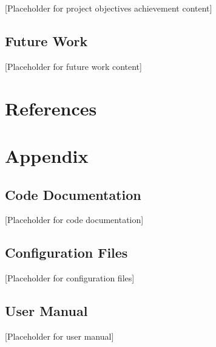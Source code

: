 \documentclass[12pt,a4paper]{article}
\begin{document}

[Placeholder for project objectives achievement content]

\subsection{Future Work}


[Placeholder for future work content]

\section{References}

\printbibliography

\section{Appendix}


\subsection{Code Documentation}


[Placeholder for code documentation]

\subsection{Configuration Files}


[Placeholder for configuration files]

\subsection{User Manual}


[Placeholder for user manual]
\end{document}
